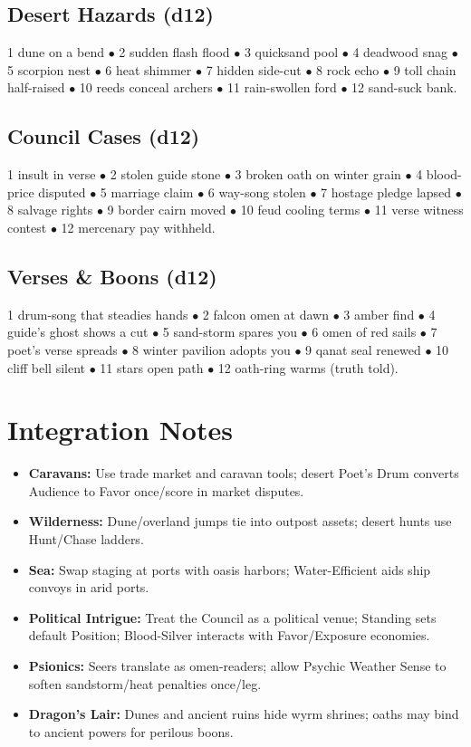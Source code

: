 \documentclass[11pt]{article}
\begin{document}
\subsection{Desert Hazards (d12)}

1 dune on a bend $\bullet$ 2 sudden flash flood $\bullet$ 3 quicksand pool $\bullet$ 4 deadwood snag $\bullet$ 5 scorpion nest $\bullet$ 6 heat shimmer $\bullet$ 7 hidden side-cut $\bullet$ 8 rock echo $\bullet$ 9 toll chain half-raised $\bullet$ 10 reeds conceal archers $\bullet$ 11 rain-swollen ford $\bullet$ 12 sand-suck bank.

\subsection{Council Cases (d12)}

1 insult in verse $\bullet$ 2 stolen guide stone $\bullet$ 3 broken oath on winter grain $\bullet$ 4 blood-price disputed $\bullet$ 5 marriage claim $\bullet$ 6 way-song stolen $\bullet$ 7 hostage pledge lapsed $\bullet$ 8 salvage rights $\bullet$ 9 border cairn moved $\bullet$ 10 feud cooling terms $\bullet$ 11 verse witness contest $\bullet$ 12 mercenary pay withheld.

\subsection{Verses \& Boons (d12)}

1 drum-song that steadies hands $\bullet$ 2 falcon omen at dawn $\bullet$ 3 amber find $\bullet$ 4 guide's ghost shows a cut $\bullet$ 5 sand-storm spares you $\bullet$ 6 omen of red sails $\bullet$ 7 poet's verse spreads $\bullet$ 8 winter pavilion adopts you $\bullet$ 9 qanat seal renewed $\bullet$ 10 cliff bell silent $\bullet$ 11 stars open path $\bullet$ 12 oath-ring warms (truth told).

\section{Integration Notes}
\begin{itemize}
\item \textbf{Caravans:} Use trade market and caravan tools; desert Poet's Drum converts Audience to Favor once/score in market disputes.
\item \textbf{Wilderness:} Dune/overland jumps tie into outpost assets; desert hunts use Hunt/Chase ladders.
\item \textbf{Sea:} Swap staging at ports with oasis harbors; Water-Efficient aids ship convoys in arid ports.
\item \textbf{Political Intrigue:} Treat the Council as a political venue; Standing sets default Position; Blood-Silver interacts with Favor/Exposure economies.
\item \textbf{Psionics:} Seers translate as omen-readers; allow Psychic Weather Sense to soften sandstorm/heat penalties once/leg.
\item \textbf{Dragon's Lair:} Dunes and ancient ruins hide wyrm shrines; oaths may bind to ancient powers for perilous boons.
\end{itemize}
\end{document}
